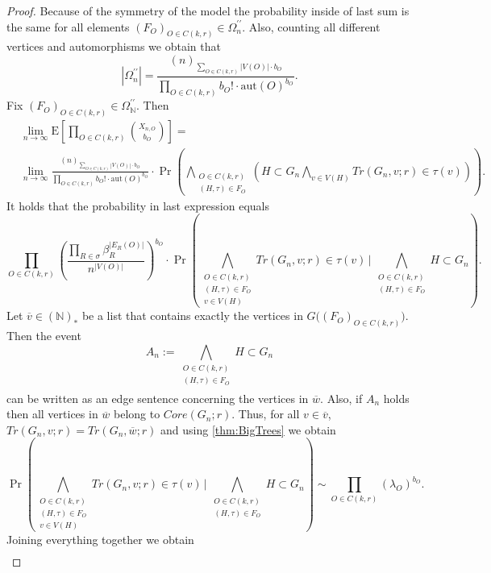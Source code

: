 \documentclass[12pt,notitlepage,a4paper]{article}
\theoremstyle{definition}
\newcommand{\N}{\mathbb{N}}
\newcommand{\Ln}{\lim\limits_{n\to \infty}}
\newcommand{\aut}{\mathrm{aut}}
\begin{document}
\begin{proof}
	Because of the symmetry of the model the probability inside of last sum 
	is the same for all elements $(F_O)_{O\in C(k,r)}\in \Omega_n^{\prime\prime}$.
	Also, counting all different vertices and automorphisms we obtain that
	\[
	|\Omega_n^{\prime\prime}|=
	\frac{(n)_{\sum_{O\in C(k,r)} |V(O)|\cdot b_O}}
	{\prod_{O\in C(k,r)} b_O!\cdot \aut(O)^{b_O}}.
	\]
	Fix $(F_O)_{O\in C(k,r)}\in \Omega_\N^{\prime\prime}$. Then 
	\begin{align*}
	&\Ln \mathrm{E}\left[
	\prod_{O\in C(k,r)}
	\binom{X_{n,O}}{b_O}
	\right]=\\
	&
	\Ln
	\frac{(n)_{\sum_{O\in C(k,r)} |V(O)|\cdot b_O}}
	{\prod_{O\in C(k,r)} b_O!\cdot \aut(O)^{b_O}} \cdot
	\Pr\left(
	\bigwedge_{
		\substack{
			O\in C(k,r)\\
			(H,\tau)\in F_O
	}}
	\left(
	H\subset G_n
	\bigwedge_{v\in V(H)}
	Tr(G_n,v;r)\in \tau(v)
	\right)
	\right).
	\end{align*}
	It holds that the probability in last expression equals
	\[
	\prod_{O\in C(k,r)}
	\left( 
	\frac{\prod_{R\in \sigma} \beta_R^{|E_R(O)|}}{n^{|V(O)|}}
	\right)^{b_O} \cdot
	\Pr\left(
	\bigwedge_{
		\substack{
			O\in C(k,r)\\
			(H,\tau)\in F_O\\
			v\in V(H)
	}}
	Tr(G_n,v;r)\in \tau(v) \,
	\Bigg|  \,
	\bigwedge_{
		\substack{
			O\in C(k,r)\\
			(H,\tau)\in F_O\\
		}}
	H\subset G_n
	\right).
	\]
	Let $\overline{v}\in (\N)_*$ be 
	a list that contains exactly the vertices in $G\big(
	(F_O)_{O\in C(k,r)}	\big)$. Then the event
	\[
	A_n:=
		\bigwedge_{
		\substack{
			O\in C(k,r)\\
			(H,\tau)\in F_O\\
	}}
	H\subset G_n
	\]
	can be written as an edge sentence concerning the vertices in $\overline{w}$.
	Also, if $A_n$ holds then all vertices in $\overline{w}$ belong to 
	$Core(G_n;r)$. Thus, for all $v\in \overline{v}$,
	$Tr(G_n,v;r)=Tr(G_n,\overline{w};r)$ and using \cref{thm:BigTrees}
	we obtain
	\[
	\Pr\left(
	\bigwedge_{
		\substack{
			O\in C(k,r)\\
			(H,\tau)\in F_O\\
			v\in V(H)
	}}
	Tr(G_n,v;r)\in \tau(v) \,
	\Bigg|  \,
	\bigwedge_{
		\substack{
			O\in C(k,r)\\
			(H,\tau)\in F_O\\
	}}
	H\subset G_n
	\right) \sim
	\prod_{O\in C(k,r)} (\lambda_O)^{b_O}.	
	\]
	Joining everything together we obtain
	\begin{align*}

\end{align*}
\end{proof}
\end{document}
